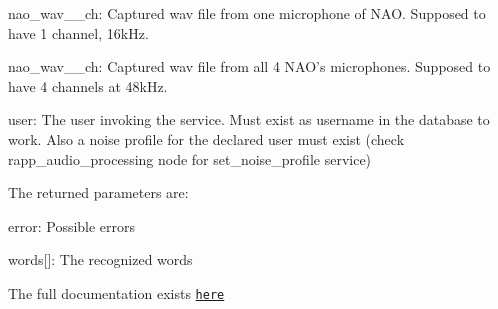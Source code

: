 \begin{DoxyItemize}
\begin{DoxyItemize}
\item nao\-\_\-wav\-\_\-\_\-ch\-: Captured wav file from one microphone of N\-A\-O. Supposed to have 1 channel, 16k\-Hz.
\item nao\-\_\-wav\-\_\-\_\-ch\-: Captured wav file from all 4 N\-A\-O's microphones. Supposed to have 4 channels at 48k\-Hz.
\end{DoxyItemize}
\item {\ttfamily user}\-: The user invoking the service. Must exist as username in the database to work. Also a noise profile for the declared user must exist (check rapp\-\_\-audio\-\_\-processing node for set\-\_\-noise\-\_\-profile service)
\end{DoxyItemize}

The returned parameters are\-:


\begin{DoxyItemize}
\item {\ttfamily error}\-: Possible errors
\item {\ttfamily words\mbox{[}\mbox{]}}\-: The recognized words
\end{DoxyItemize}

The full documentation exists \href{https://github.com/rapp-project/rapp-platform/tree/master/rapp_web_services/services#speech-detection-sphinx4}{\tt here} 